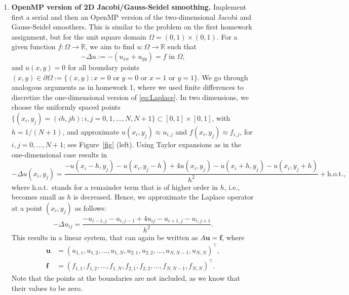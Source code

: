 \documentclass[12pt]{article}
\newcommand{\bs}{\boldsymbol}
\begin{document}
\begin{enumerate}
\item {\bf OpenMP version of 2D Jacobi/Gauss-Seidel smoothing.}
  Implement first a serial and then an OpenMP version of the
  two-dimensional Jacobi and Gauss-Seidel smoothers. This is similar
  to the problem on the first homework assignment, but for the unit
  square domain $\Omega=(0,1)\times (0,1)$. For a given function
  $f:\Omega\to \mathbb R$, we aim to find $u:\Omega\to \mathbb R$ such
  that
  \begin{equation}\label{eq:Laplace}
    -\Delta u := -(u_{xx}+u_{yy}) = f \text { in } \Omega,
  \end{equation}
  and $u(x,y) = 0$ for all boundary points $(x,y)\in \partial\Omega :=
  \{(x,y) : x=0 \text{ or } y=0 \text{ or } x=1 \text{ or } y=1\}$.
  We go through analogous arguments
  as in homework 1, where we used finite differences to discretize the
  one-dimensional version of \eqref{eq:Laplace}. In two dimensions, we
  choose the uniformly spaced points
  $\{(x_i,y_j)=(ih,jh):i,j=0,1,\ldots,N,N+1\}\subset [0,1]\times
  [0,1]$, with $h = 1/(N+1)$, and approximate $u(x_i,y_j)\approx
  u_{i,j}$ and $f(x_i,y_j)\approx f_{i,j}$, for $i,j=0,\ldots,
  N+1$; see Figure~\ref{fig} (left).  Using Taylor expansions as in
  the one-dimensional case results in
  $$
  -\Delta u(x_i,y_j) = \frac{-u(x_i\!-\!h,y_j) \!-\! u(x_i,y_j\!-\!h)  \!+\! 4u(x_i,y_j) \!-\!
    u(x_i\!+\!h,y_j) \!-\!  u(x_i,y_j\!+\!h)}{h^2} + \text{h.o.t.},
  $$
  where h.o.t.\ stands for a remainder term that is of higher order in
  $h$, i.e., becomes small as $h$ is decreased. Hence, we approximate the
  Laplace operator at a point $(x_i,y_j)$ as follows:
  $$
-\Delta  u_{ij} = \frac{-u_{i-1,j} - u_{i,j-1} + 4u_{ij} - u_{i+1,j} -
    u_{i,j+1} }{h^2}.
  $$ This results in a linear system, that can again be written as
  $A\bs u = \bs f$,
  where
  \begin{align*}
    \bs u&=(u_{1,1},u_{1,2},\ldots,u_{1,N},u_{2,1},u_{2,2},\ldots,u_{N,N-1},u_{N,N})^\top,\\
    \bs f&=(f_{1,1},f_{1,2},\ldots,f_{1,N},f_{2,1},f_{2,2},\ldots,f_{N,N-1},f_{N,N})^\top.
  \end{align*}
  Note that the points at the boundaries are not included, as we know
  that their values to be zero.
\begin{figure}\centering
\end{figure}
\end{enumerate}
\end{document}
